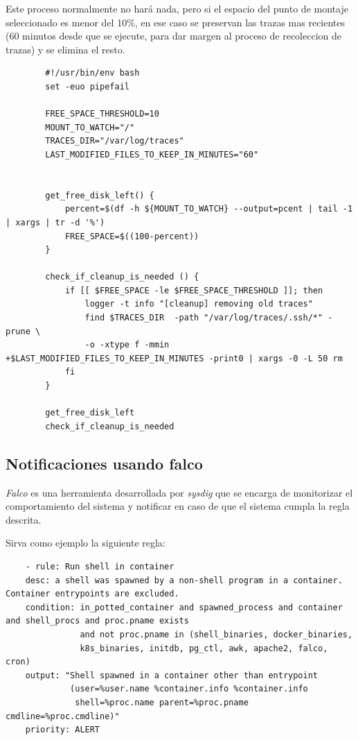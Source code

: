 Este proceso normalmente no hará nada, pero si el espacio del punto de montaje seleccionado es menor del 10\%, en ese caso
se preservan las trazas mas recientes (60 minutos desde que se ejecute, para dar margen al proceso de recoleccion de trazas) y se elimina el resto.

    \begin{verbatim}
        #!/usr/bin/env bash
        set -euo pipefail
        
        FREE_SPACE_THRESHOLD=10
        MOUNT_TO_WATCH="/"
        TRACES_DIR="/var/log/traces"
        LAST_MODIFIED_FILES_TO_KEEP_IN_MINUTES="60"
        
        
        get_free_disk_left() {
            percent=$(df -h ${MOUNT_TO_WATCH} --output=pcent | tail -1 | xargs | tr -d '%')
            FREE_SPACE=$((100-percent))
        }
        
        check_if_cleanup_is_needed () {
            if [[ $FREE_SPACE -le $FREE_SPACE_THRESHOLD ]]; then
                logger -t info "[cleanup] removing old traces"
                find $TRACES_DIR  -path "/var/log/traces/.ssh/*" -prune \
                -o -xtype f -mmin +$LAST_MODIFIED_FILES_TO_KEEP_IN_MINUTES -print0 | xargs -0 -L 50 rm
            fi
        }
        
        get_free_disk_left
        check_if_cleanup_is_needed
    \end{verbatim}
    

\subsection{Notificaciones usando falco}
\label{subsec:notificaciones-falco}

\emph{Falco} es una herramienta desarrollada por \emph{sysdig} que se encarga de monitorizar el comportamiento del sistema y notificar en 
caso de que el sistema cumpla la regla descrita.

Sirva como ejemplo la siguiente regla:

\begin{verbatim}
    - rule: Run shell in container
    desc: a shell was spawned by a non-shell program in a container. Container entrypoints are excluded.
    condition: in_potted_container and spawned_process and container and shell_procs and proc.pname exists 
               and not proc.pname in (shell_binaries, docker_binaries, 
               k8s_binaries, initdb, pg_ctl, awk, apache2, falco, cron)
    output: "Shell spawned in a container other than entrypoint 
             (user=%user.name %container.info %container.info 
              shell=%proc.name parent=%proc.pname cmdline=%proc.cmdline)"
    priority: ALERT
\end{verbatim}
\bigskip

